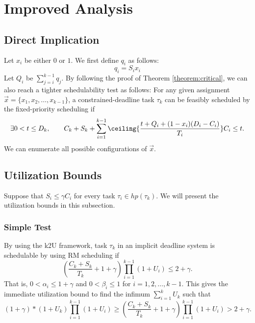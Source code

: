 \section{Improved Analysis}

\subsection{Direct Implication}

Let $x_i$ be either $0$ or $1$. We first define $q_i$ as follows:
\begin{equation}
  \label{eq:qi}
  q_i = S_i x_i
\end{equation}
Let $Q_i$ be $\sum_{j=i}^{k-1} q_j$.  
By following the proof of Theorem \ref{theorem:critical}, we can also reach a tighter schedulability test as follows: For any given assignment $\vec{x} = \{x_1, x_2, \ldots, x_{k-1}\}$, a constrained-deadline task $\tau_k$ can be feasibly scheduled by the fixed-priority scheduling if
\begin{equation} \label{eq:TDA-suspension-tighter} 
\exists 0 < t \leq D_k, \qquad C_k+S_k+ \sum_{i=1}^{k-1}\ceiling{\frac{t+Q_i+(1-x_i)(D_i-C_i)}{T_i}} C_i \leq t.
\end{equation}
We can enumerate all possible configurations of $\vec{x}$.
  
\subsection{Utilization Bounds}
Suppose that $S_i \leq \gamma C_i$ for every task $\tau_i \in hp(\tau_k)$. We will present the utilization bounds in this subsection. 

\subsubsection{Simple Test}

By using the k2U framework, task $\tau_k$ in an implicit deadline system is schedulable by using RM scheduling if
\[
(\frac{C_k + S_k}{ T_k}+1+\gamma) \prod_{i=1}^{k-1}(1+U_i) \leq 2+\gamma.
\]
That is, $0 < \alpha_i \leq  1+\gamma$ and $0 < \beta_i \leq 1$ for $i=1,2,\ldots,k-1$.
This gives the immediate utilization bound to find the infimum $\sum_{i=1}^{k} U_k$ such that
\[
(1+\gamma)*(1+U_k) \prod_{i=1}^{k-1}(1+U_i) \geq  (\frac{C_k + S_k}{ T_k}+1+\gamma) \prod_{i=1}^{k-1}(1+U_i) > 2+\gamma.
\]
  
  
  
  
  
  
  
  
  
  
  
  
  
  
  
  